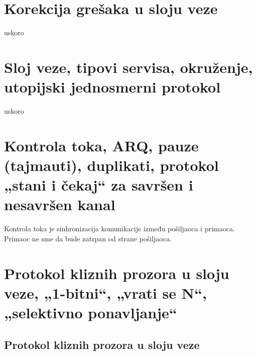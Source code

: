 \documentclass{article} %
\begin{document}
\section{Korekcija grešaka u sloju veze}
uskoro
\section{Sloj veze, tipovi servisa, okruženje, utopijski jednosmerni protokol}
uskoro
\section{Kontrola toka, ARQ, pauze (tajmauti), duplikati, protokol „stani i čekaj“ za savršen i nesavršen kanal}
Kontrola toka je sinhronizacija komunikacije između pošiljaoca i primaoca. Primaoc ne sme da bude zatrpan od strane pošiljaoca.

\section{Protokol kliznih prozora u sloju veze, „1-bitni“, „vrati se N“, „selektivno ponavljanje“}

\subsection{Protokol kliznih prozora u sloju veze}
\end{document}
